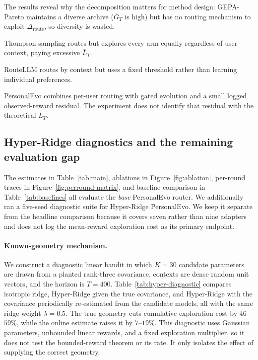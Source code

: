 \documentclass{article} %
\begin{document}
The results reveal why the decomposition matters for method design: GEPA-Pareto maintains a diverse archive ($\bar G_T$ is high) but has no routing mechanism to exploit $\Delta_{\mathrm{route}}$, so diversity is wasted.

Thompson sampling routes but explores every arm equally regardless of user context, paying excessive $\bar L_T$.

RouteLLM routes by context but uses a fixed threshold rather than learning individual preferences.

PersonalEvo combines per-user routing with gated evolution and a small logged observed-reward residual. The experiment does not identify that residual with the theoretical \(\bar L_T\).

\subsection{Hyper-Ridge diagnostics and the remaining evaluation gap}
\label{sec:exp-hyper-ridge-plan}

The estimates in Table~\ref{tab:main}, ablations in
Figure~\ref{fig:ablation}, per-round traces in
Figure~\ref{fig:perround-matrix}, and baseline comparison in
Table~\ref{tab:baselines} all evaluate the \emph{base} PersonalEvo router. We
additionally ran a five-seed diagnostic suite for Hyper-Ridge PersonalEvo. We
keep it separate from the headline comparison because it covers seven rather
than nine adapters and does not log the mean-reward exploration cost as its
primary endpoint.

\paragraph{Known-geometry mechanism.}
We construct a diagnostic linear bandit in which $K=30$ candidate parameters are drawn from a planted rank-three covariance, contexts are dense random unit vectors, and the horizon is $T=400$. Table~\ref{tab:hyper-diagnostic} compares isotropic ridge, Hyper-Ridge given the true covariance, and Hyper-Ridge with the covariance periodically re-estimated from the candidate models, all with the same ridge weight $\lambda=0.5$. The true geometry cuts cumulative exploration cost by $46$--$59\%$, while the online estimate raises it by $7$--$19\%$. This diagnostic uses Gaussian parameters, unbounded linear rewards, and a fixed exploration multiplier, so it does not test the bounded-reward theorem or its rate. It only isolates the effect of supplying the correct geometry.
\end{document}
